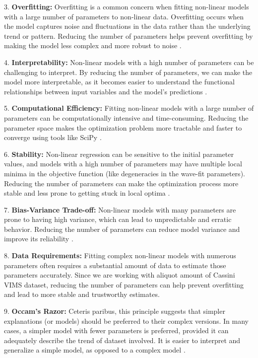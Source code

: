 \documentclass{article}
\begin{document}
3. \textbf{Overfitting:} Overfitting is a common concern when fitting non-linear models with a large number of parameters to non-linear data. Overfitting occurs when the model captures noise and fluctuations in the data rather than the underlying trend or pattern. Reducing the number of parameters helps prevent overfitting by making the model less complex and more robust to noise \cite{bishop2006pattern}.

4. \textbf{Interpretability:} Non-linear models with a high number of parameters can be challenging to interpret. By reducing the number of parameters, we can make the model more interpretable, as it becomes easier to understand the functional relationships between input variables and the model's predictions \cite{molnar2020interpretable}.

5. \textbf{Computational Efficiency:} Fitting non-linear models with a large number of parameters can be computationally intensive and time-consuming. Reducing the parameter space makes the optimization problem more tractable and faster to converge using tools like SciPy \cite{nocedal2006numerical}.

6. \textbf{Stability:} Non-linear regression can be sensitive to the initial parameter values, and models with a high number of parameters may have multiple local minima in the objective function (like degeneracies in the wave-fit parameters). Reducing the number of parameters can make the optimization process more stable and less prone to getting stuck in local optima \cite{nocedal2006numerical}.

7. \textbf{Bias-Variance Trade-off:} Non-linear models with many parameters are prone to having high variance, which can lead to unpredictable and erratic behavior. Reducing the number of parameters can reduce model variance and improve its reliability \cite{hastie2009elements}.

8. \textbf{Data Requirements:} Fitting complex non-linear models with numerous parameters often requires a substantial amount of data to estimate those parameters accurately. Since we are working with aliquot amount of Cassini VIMS dataset, reducing the number of parameters can help prevent overfitting and lead to more stable and trustworthy estimates.

9. \textbf{Occam's Razor:} Ceteris paribus, this principle suggests that simpler explanations (or models) should be preferred to their complex versions. In many cases, a simpler model with fewer parameters is preferred, provided it can adequately describe the trend of dataset involved. It is easier to interpret and generalize a simple model, as opposed to a complex model \cite{Sober2015-SOBORA}.
\end{document}
